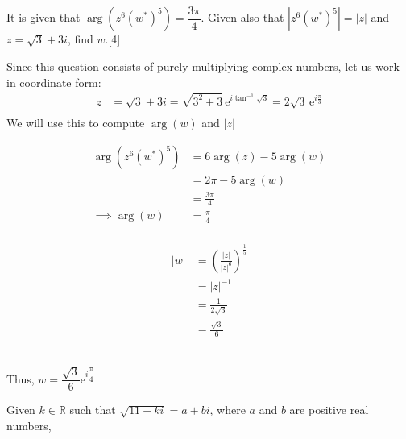 \documentclass[12pt, a4 paper]{article}
\begin{document}
\begin{outline}[enumerate]
	\1 It is given that $\arg{(z^6(w^*)^5)}=\dfrac{3\pi}{4}$. Given also that $|z^6(w^*)^5|=|z|$ and $z=\sqrt{3}+3i$, find $w$.\hfill[4] %
	\begin{answer}
		Since this question consists of purely multiplying complex numbers, let us work in coordinate form:
		\begin{align*}
			z & =\sqrt{3}+3i=\sqrt{3^2+3}\,\mathrm{e}^{i\tan^{-1}{\sqrt{3}}} = 2\sqrt{3}\,\mathrm{e}^{i\frac{\pi}{3}} \\
		\end{align*}
		We will use this to compute $\arg(w)$ and $|z|$ \\
		\noindent
		\begin{minipage}{.3\textwidth}
			\begin{align*}
				\arg{(z^6(w^*)^5)} & = 6\arg(z) - 5\arg(w) \\
				                   & = 2\pi - 5\arg(w)     \\
				                   & = \frac{3\pi}{4}      \\
				\implies \arg(w)   & = \frac{\pi}{4}       \\
			\end{align*}
		\end{minipage}%
		\begin{minipage}{.5\textwidth}
			\begin{align*}
				|w| & = \left(\frac{|z|}{|z|^6}\right)^{\frac{1}{5}} \\
				    & = |z|^{-1}                                     \\
				    & = \frac{1}{2\sqrt{3}}                          \\
				    & = \frac{\sqrt{3}}{6}
			\end{align*}
		\end{minipage} \\
		Thus, $w = \dfrac{\sqrt{3}}{6}\mathrm{e}^{i\dfrac{\pi}{4}}$
	\end{answer}

	\1 Given $k \in \mathbb{R}$ such that $\sqrt{11+ki}=a+bi$, where $a$ and $b$ are positive real numbers, %


\end{outline}
\end{document}
